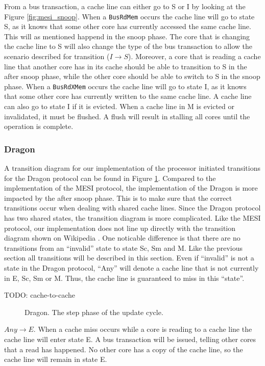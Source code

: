 From a bus transaction, a cache line can either go to S or I by looking at the Figure \ref{fig:mesi_snoop}.
When a \texttt{BusRdMem} occurs the cache line will go to state S, as it knows that some other core has currently accessed the same cache line.
This will as mentioned happend in the snoop phase.
The core that is changing the cache line to S will also change the type of the bus transaction to allow the scenario described for transition ($I \to S$).
Moreover, a core that is reading a cache line that another core has in its cache should be able to transition to S in the after snoop phase, while the other core should be able to switch to S in the snoop phase.
When a \texttt{BusRdXMem} occurs the cache line will go to state I, as it knows that some other core has currently written to the same cache line.
A cache line can also go to state I if it is evicted.
When a cache line in M is evicted or invalidated, it must be flushed.
A flush will result in stalling all cores until the operation is complete.

\subsubsection{Dragon}
A transition diagram for our implementation of the processor initiated transitions for the Dragon protocol can be found in Figure \ref{fig:dragon}.
Compared to the implementation of the MESI protocol, the implementation of the Dragon is more impacted by the after snoop phase.
This is to make sure that the correct transitions occur when dealing with shared cache lines.
Since the Dragon protocol has two shared states, the transition diagram is more complicated.
Like the MESI protocol, our implementation does not line up directly with the transition diagram shown on Wikipedia \cite{dragon_wiki}.
One noticable difference is that there are no transitions from an ``invalid'' state to state Sc, Sm and M.
Like the previous section all transitions will be described in this section.
Even if ``invalid'' is not a state in the Dragon protocol, ``Any'' will denote a cache line that is not currently in E, Sc, Sm or M.
Thus, the cache line is guaranteed to miss in this ``state''.

TODO: cache-to-cache

\begin{figure}[H]
    \centering
    \caption{Dragon. The step phase of the update cycle.}
    \label{fig:dragon}
\end{figure}

$Any \to E$.
When a cache miss occurs while a core is reading to a cache line the cache line will enter state E.
A bus transaction will be issued, telling other cores that a read has happened.
No other core has a copy of the cache line, so the cache line will remain in state E.

